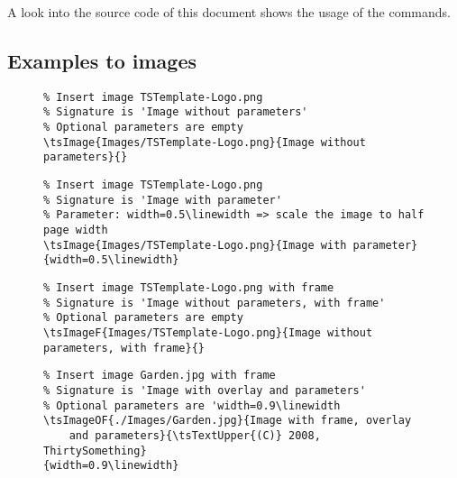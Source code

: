 A look into the source code of this document shows the usage of the commands.

\newpage
\subsection{Examples to images}

\begin{figure}[H]
    \small
    \centering
    \begin{BVerbatim}
\tsImage{Images/TSTemplate-Logo.png}{Image without parameters}{}
    \end{BVerbatim}
\end{figure}


\begin{figure}[H]
    \small
    \centering
    \begin{BVerbatim}
\tsImage{Images/TSTemplate-Logo.png}{Image with parameter}{width=0.5\linewidth}
    \end{BVerbatim}
\end{figure}


\begin{figure}[H]
    \small
    \centering
    \begin{BVerbatim}
\tsImageF{Images/TSTemplate-Logo.png}{Image without parameters, with frame}{}
    \end{BVerbatim}
\end{figure}


\begin{figure}[H]
    \small
    \centering
    \begin{BVerbatim}
\tsImageOF{./Images/Garden.jpg}{Image with frame, overlay
	and parameters}{\tsTextUpper{(C)} 2008, ThirtySomething}
{width=0.9\linewidth}
    \end{BVerbatim}
\end{figure}


